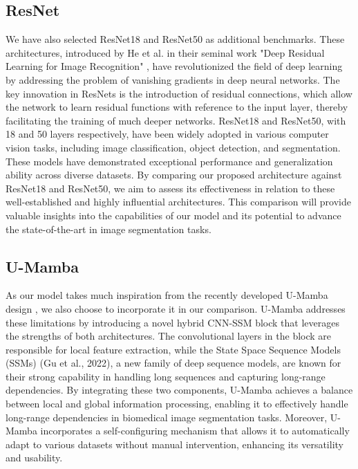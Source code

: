 \documentclass[conference]{IEEEtran}
\begin{document}
\subsection{ResNet}
We have also selected ResNet18 and ResNet50 as additional benchmarks. These architectures, introduced by He et al. in their seminal work "Deep Residual Learning for Image Recognition" \cite{DBLP:journals/corr/HeZRS15}, have revolutionized the field of deep learning by addressing the problem of vanishing gradients in deep neural networks. The key innovation in ResNets is the introduction of residual connections, which allow the network to learn residual functions with reference to the input layer, thereby facilitating the training of much deeper networks. ResNet18 and ResNet50, with 18 and 50 layers respectively, have been widely adopted in various computer vision tasks, including image classification, object detection, and segmentation. These models have demonstrated exceptional performance and generalization ability across diverse datasets. By comparing our proposed architecture against ResNet18 and ResNet50, we aim to assess its effectiveness in relation to these well-established and highly influential architectures. This comparison will provide valuable insights into the capabilities of our model and its potential to advance the state-of-the-art in image segmentation tasks.
\subsection{U-Mamba}
As our model takes much inspiration from the recently developed U-Mamba design \cite{U-Mamba}, we also choose to incorporate it in our comparison. U-Mamba addresses these limitations by introducing a novel hybrid CNN-SSM block that leverages the strengths of both architectures. The convolutional layers in the block are responsible for local feature extraction, while the State Space Sequence Models (SSMs) (Gu et al., 2022), a new family of deep sequence models, are known for their strong capability in handling long sequences and capturing long-range dependencies. By integrating these two components, U-Mamba achieves a balance between local and global information processing, enabling it to effectively handle long-range dependencies in biomedical image segmentation tasks. Moreover, U-Mamba incorporates a self-configuring mechanism that allows it to automatically adapt to various datasets without manual intervention, enhancing its versatility and usability.
\end{document}
